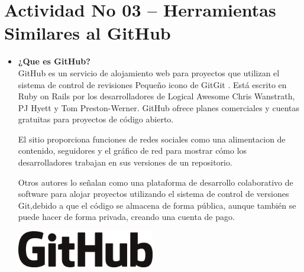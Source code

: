 \section{Actividad No 03 – Herramientas Similares al GitHub} 
		
\begin{itemize} %
\item \textbf{¿Que es GitHub?}\\

GitHub es un servicio de alojamiento web para proyectos que utilizan el sistema de control de revisiones Pequeño icono de GitGit . Está escrito en Ruby on Rails por los desarrolladores de Logical Awesome Chris Wanstrath, PJ Hyett y Tom Preston-Werner. GitHub ofrece planes comerciales y cuentas gratuitas para proyectos de código abierto.

El sitio proporciona funciones de redes sociales como una alimentacion de contenido, seguidores y el gráfico de red para mostrar cómo los desarrolladores trabajan en sus versiones de un repositorio.

Otros autores lo señalan como una plataforma de desarrollo colaborativo de software para alojar proyectos utilizando el sistema de control de versiones Git,debido a que el código se almacena de forma pública, aunque también se puede hacer de forma privada, creando una cuenta de pago.\\

\begin{center}
\includegraphics[width=6cm]{./Imagenes/actividad0301} 
\end{center}
	
\end{itemize} 


